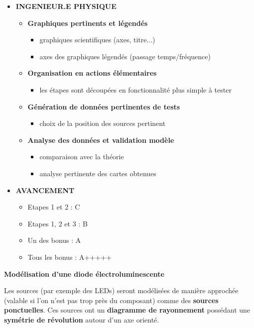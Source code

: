 \documentclass[10pt]{article} %
\begin{document}
\begin{itemize}
	\item \textbf{INGENIEUR.E PHYSIQUE}
	\begin{itemize}
		\item \textbf{Graphiques pertinents et légendés}
		\begin{itemize}
			\item graphiques scientifiques (axes, titre...)
			\item axes des graphiques légendés (passage temps/fréquence)
		\end{itemize}		 
		\item \textbf{Organisation en actions élémentaires}
		\begin{itemize}
			\item les étapes sont découpées en fonctionnalité plus simple à tester
		\end{itemize}
		\item \textbf{Génération de données pertinentes de tests}
		\begin{itemize}
			\item choix de la position des sources pertinent
		\end{itemize}
		\item \textbf{Analyse des données et validation modèle}
		\begin{itemize}
			\item comparaison avec la théorie
			\item analyse pertinente des cartes obtenues
		\end{itemize}
	\end{itemize}
	
	\item \textbf{AVANCEMENT}
	\begin{itemize}
		\item Etapes 1 et 2 : C
		\item Etapes 1, 2 et 3 : B
		\item Un des bonus : A
		\item Tous les bonus : A+++++
	\end{itemize}
\end{itemize}



\newpage

\hypertarget{stepbystep}{}

\textbf{Modélisation d'une diode électroluminescente}

Les sources (par exemple des LEDs) seront modélisées de manière approchée (valable si l'on n'est pas trop près du composant) comme des \textbf{sources ponctuelles}. Ces sources ont un \textbf{diagramme de rayonnement} possédant une \textbf{symétrie de révolution} autour d'un axe orienté. 
\end{document}
